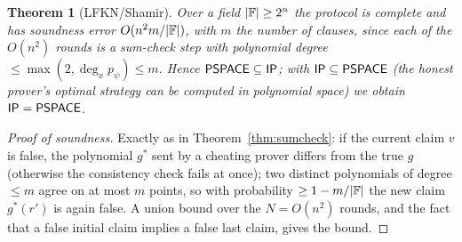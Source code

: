 \documentclass[11pt,a4paper]{report}
\theoremstyle{plain}
\newtheorem{theorem}{Theorem}[chapter]
\theoremstyle{definition}
\theoremstyle{remark}
\newcommand{\PSPACE}{\mathsf{PSPACE}}\newcommand{\AM}{\mathsf{AM}}\newcommand{\coAM}{\mathsf{coAM}}
\begin{document}
\begin{theorem}[LFKN/Shamir]
Over a field $|\mathbb{F}|\ge2^n$ the protocol is complete and has soundness error $O(n^2m/|\mathbb{F}|)$, with $m$ the number of clauses, since each of the $O(n^2)$ rounds is a sum-check step with polynomial degree $\le\max(2,\deg_x p_\psi)\le m$. Hence $\PSPACE\subseteq\IP$; with $\IP\subseteq\PSPACE$ (the honest prover's optimal strategy can be computed in polynomial space) we obtain $\IP=\PSPACE$.
\end{theorem}
\begin{proof}[Proof of soundness]
Exactly as in Theorem~\ref{thm:sumcheck}: if the current claim $v$ is false, the polynomial $g^*$ sent by a cheating prover differs from the true $g$ (otherwise the consistency check fails at once); two distinct polynomials of degree $\le m$ agree on at most $m$ points, so with probability $\ge1-m/|\mathbb{F}|$ the new claim $g^*(r')$ is again false. A union bound over the $N=O(n^2)$ rounds, and the fact that a false initial claim implies a false last claim, gives the bound.
\end{proof}
\end{document}
